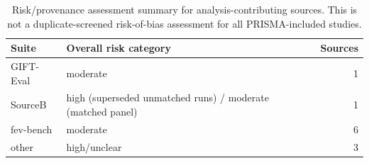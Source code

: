 \begin{table}[htbp]
\centering
\caption{Risk/provenance assessment summary for analysis-contributing sources.  This is not a duplicate-screened risk-of-bias assessment for all PRISMA-included studies.}
\label{tab:risk-of-bias-summary}
\small
\begin{tabular}{llr}
\toprule
Suite & Overall risk category & Sources \\
\midrule
GIFT-Eval & moderate & 1 \\
SourceB & high (superseded unmatched runs) / moderate (matched panel) & 1 \\
fev-bench & moderate & 6 \\
other & high/unclear & 3 \\
\bottomrule
\end{tabular}
\end{table}
